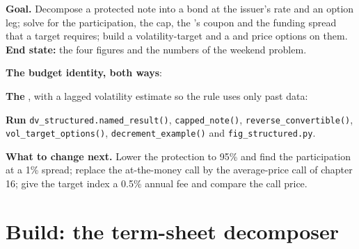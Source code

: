 \begin{tutorial}
\textbf{Goal.} Decompose a protected note into a bond at the issuer's rate and an option leg; solve for the participation, the cap, the
's coupon and the funding spread that a target requires; build a volatility-target and a  and price
options on them. \textbf{End state:} the four figures and the numbers of the weekend problem.
\begin{tutsteps}
\item \textbf{The budget identity, both ways}:
\label{lst:dv:the-structured-products-business:budget}
\item \textbf{The }, with a lagged volatility estimate so the rule uses only past data:
\label{lst:dv:the-structured-products-business:vt}
\item \textbf{Run} \texttt{dv\_structured.named\_result()}, \texttt{capped\_note()}, \texttt{reverse\_convertible()},
\texttt{vol\_target\_options()}, \texttt{decrement\_example()} and \texttt{fig\_structured.py}.
\end{tutsteps}
\textbf{What to change next.} Lower the protection to 95\% and find the participation at a 1\% spread; replace the at-the-money call by the
average-price call of chapter 16; give the target index a 0.5\% annual fee and compare the call price.
\end{tutorial}

\section{Build: the term-sheet decomposer}\label{bld:dv:the-structured-products-business:termsheet}

